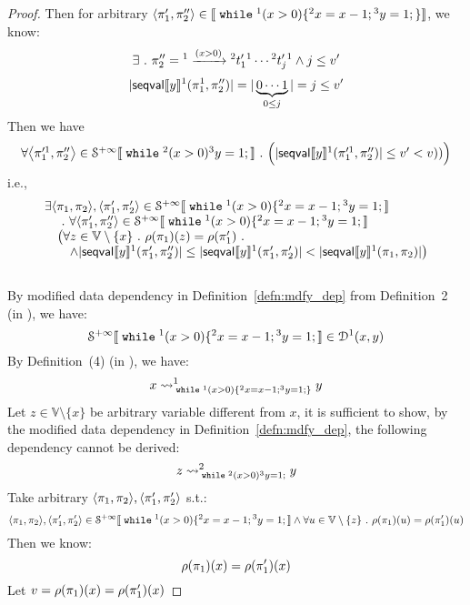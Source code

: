 \begin{example}
\begin{proof}
%
%
Then for arbitrary $\left< \pi_1', \pi''_2 \right> \in \sem{\ewhile {}^1 (x > 0) \{{}^2 x = x - 1; {}^3 y = 1;\} }$, we know:
\[
	\exists ~.~ \pi''_2 =  {}^1 \xrightarrow{(x > 0)} {}^2 t'_1 {}^1 \cdots  {}^2 t'_{j} {}^1 \land j \leq v'
\]
%
\[
	|\mathsf{seqval}\llbracket y \rrbracket{}^1(\pi_1^1, \pi_2'' )| = |\underbrace{0 \cdots 1}_{0 \leq j}| = j \leq v'
\]
%
Then we have
\[
\begin{array}{l}
	\forall \left< \pi_1'^1, \pi''_2 \right> \in \mathcal{S}^{+\infty} \sem{\ewhile {}^2 (x > 0) {}^3 y = 1;} \st
	\Big(
	|\mathsf{seqval}\sem{y}{}^1(\pi_1'^1, \pi_2'' )| \leq v' < v))\Big)
\end{array}
\] 
%
i.e.,
\[
	\begin{array}{l}
	\exists \langle \pi_1, \pi_2 \rangle, \langle \pi_1', \pi_2' \rangle \in \mathcal{S}^{+\infty}\llbracket \;\mathtt{while}\; {}^1 (x > 0) \{{}^2 x = x - 1; {}^3 y = 1; \rrbracket \\
	\quad ~.~ \forall \langle \pi_1', \pi_2'' \rangle \in \mathcal{S}^{+\infty}\llbracket \;\mathtt{while}\; {}^1 (x > 0) \{{}^2 x = x - 1; {}^3 y = 1; \rrbracket \\
	\quad \big(
	\forall z \in \mathbb{V}\setminus \{x\} ~.~ \rho(\pi_1)(z) = \rho(\pi_1') ~.~ \\
	\quad  \quad  \land |\mathsf{seqval}\llbracket y \rrbracket{}^1(\pi_1', \pi_2'')| 
	\leq |\mathsf{seqval}\llbracket y \rrbracket{}^1(\pi_1', \pi_2')| <  
	|\mathsf{seqval}\llbracket y \rrbracket{}^1(\pi_1, \pi_2)|\big) 	
	\end{array}
\]
\\
%
By modified data dependency in Definition~\ref{defn:mdfy_dep} from Definition~2 (in \cite{cousot2019abstract}), we have:
\[
	\mathcal{S}^{+\infty}\llbracket \;\mathtt{while}\; {}^1 (x > 0) \{{}^2 x = x - 1; {}^3 y = 1; \rrbracket 
	\in \mathcal{D}^1(x, y)
\]
%
By Definition~(4) (in \cite{cousot2019abstract}), we have:
\[
	x \rightsquigarrow^{1}_{\;\mathtt{while}\; {}^1 (x > 0) \{{}^2 x = x - 1; {}^3 y = 1;\}} y
\]
%
%
Let $z \in \mathbb{V}\setminus \{x\}$ be arbitrary variable different from $x$, it is sufficient to show,
by the modified data dependency in Definition~\ref{defn:mdfy_dep}, the following dependency cannot be derived:
\[
	z \rightsquigarrow^{2}_{\;\mathtt{while}\; {}^2 (x > 0) {}^3 y = 1;} y
\]
Take arbitrary $\langle \pi_1, \pi_2 \rangle, \langle \pi_1', \pi_2' \rangle$ s.t.:
\[
	\langle \pi_1, \pi_2 \rangle, \langle \pi_1', \pi_2' \rangle \in \mathcal{S}^{+\infty}\llbracket \;\mathtt{while}\; {}^1 (x > 0) \{{}^2 x = x - 1; {}^3 y = 1; \rrbracket  
	\land \forall u \in \mathbb{V}\setminus \{z\} ~.~ \rho(\pi_1)(u) = \rho(\pi_1')(u)
	\]
Then we know:
\[
	\rho(\pi_1)(x) = \rho(\pi_1')(x)
\]
Let $v = \rho(\pi_1)(x) = \rho(\pi_1')(x)$

\end{proof}
\end{example}
